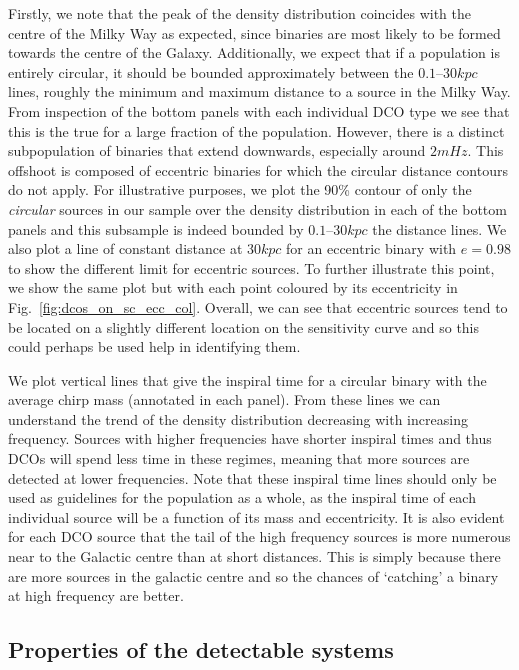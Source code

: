 Firstly, we note that the peak of the density distribution coincides with the centre of the Milky Way as expected, since binaries are most likely to be formed towards the centre of the Galaxy. Additionally, we expect that if a population is entirely circular, it should be bounded approximately between the $0.1$--$30 \unit{kpc}$ lines, roughly the minimum and maximum distance to a source in the Milky Way. From inspection of the bottom panels with each individual DCO type we see that this is the true for a large fraction of the population. However, there is a distinct subpopulation of binaries that extend downwards, especially around $2 \unit{mHz}$. This offshoot is composed of eccentric binaries for which the circular distance contours do not apply. For illustrative purposes, we plot the 90\% contour of only the \textit{circular} sources in our sample over the density distribution in each of the bottom panels and this subsample is indeed bounded by $0.1$--$30 \unit{kpc}$ the distance lines. We also plot a line of constant distance at $30 \unit{kpc}$ for an eccentric binary with $e = 0.98$ to show the different limit for eccentric sources. To further illustrate this point, we show the same plot but with each point coloured by its eccentricity in Fig.~\ref{fig:dcos_on_sc_ecc_col}. Overall, we can see that eccentric sources tend to be located on a slightly different location on the sensitivity curve and so this could perhaps be used help in identifying them.

We plot vertical lines that give the inspiral time for a circular binary with the average chirp mass (annotated in each panel). From these lines we can understand the trend of the density distribution decreasing with increasing frequency. Sources with higher frequencies have shorter inspiral times and thus DCOs will spend less time in these regimes, meaning that more sources are detected at lower frequencies. Note that these inspiral time lines should only be used as guidelines for the population as a whole, as the inspiral time of each individual source will be a function of its mass and eccentricity. It is also evident for each DCO source that the tail of the high frequency sources is more numerous near to the Galactic centre than at short distances. This is simply because there are more sources in the galactic centre and so the chances of `catching' a binary at high frequency are better.

\subsection{Properties of the detectable systems}\label{sec:fiducial_distributions}

